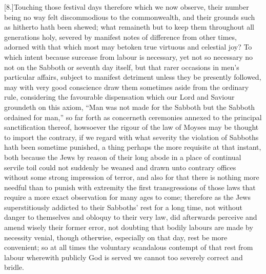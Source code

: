 [8.]Touching those festival days therefore which we now observe, their number being no way felt discommodious to the commonwealth, and their grounds such as hitherto hath been shewed; what remaineth but to keep them throughout all generations holy, severed by manifest notes of difference from other times, adorned with that which most may betoken true virtuous and celestial joy? To which intent because surcease from labour is necessary, yet not so necessary no not on the Sabboth or seventh day itself, but that rarer occasions in men’s particular affairs, subject to manifest detriment unless they be presently followed, may with very good conscience draw them sometimes aside from the ordinary rule, considering the favourable dispensation which our Lord and Saviour  groundeth on this axiom,
 “Man was not made for the Sabboth but the Sabboth ordained for man,” so far forth as concerneth ceremonies annexed to the principal sanctification thereof, howsoever the rigour of the law of Moyses may be thought to import the contrary, if we regard with what severity the violation of Sabboths hath been sometime punished, a thing perhaps the more requisite at that instant, both because the Jews by reason of their long abode in a place of continual servile toil could not suddenly be weaned and drawn unto contrary offices without some strong impression of terror, and also for that there is nothing more needful than to punish with extremity the first transgressions of those laws that require a more exact observation for many ages to come; therefore as the Jews superstitiously addicted to their Sabboths’ rest for a long time, not without danger to themselves and obloquy to their very law, did afterwards perceive and amend wisely their former error, not doubting that bodily labours are made by necessity venial, though otherwise, especially on that day, rest be more convenient; so at all times the voluntary scandalous contempt of that rest from labour wherewith publicly God is served we cannot too severely correct and bridle.

